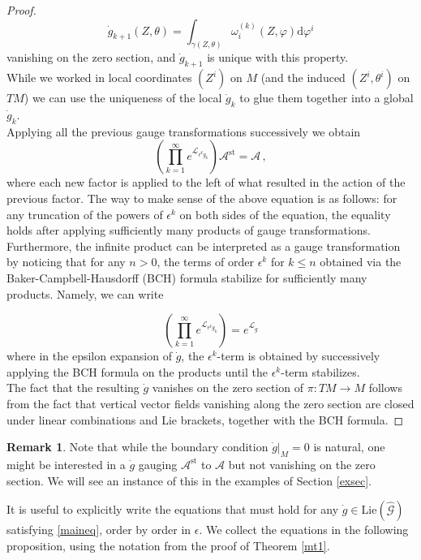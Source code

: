 \documentclass{article}
\theoremstyle{definition}
\newtheorem{remark}[theorem]{Remark}
\numberwithin{equation}{section}
\begin{document}
\begin{proof}
\begin{equation}\label{piformula}
    \dot{g}_{k+1}(Z,\theta)=\int_{\gamma(Z,\theta)}\omega_i^{(k)}(Z,\varphi)\mathrm{d}\varphi^i
\end{equation}
vanishing on the zero section, and $\dot{g}_{k+1}$ is unique with this property. \\

While we worked in local coordinates $(Z^i)$ on $M$ (and the induced $(Z^i,\theta^i)$ on $TM$) we can use the uniqueness of the local $\dot{g}_{k}$ to glue them together into a global $\dot{g}_k$.\\

Applying all the previous gauge transformations successively we obtain
\begin{equation*}
    \left(\prod_{k=1}^{\infty}e^{\mathcal{L}_{\epsilon^k\dot{g}_k}}\right)\mathcal{A}^{\text{st}}=\mathcal{A}\,,
\end{equation*}
where each new factor is applied to the left of what resulted in the action of the previous factor. The way to make sense of the above equation is as follows: for any truncation of the powers of $\epsilon^k$ on both sides of the equation, the equality holds after applying sufficiently many products of gauge transformations.  Furthermore, the infinite product can be interpreted as a gauge transformation by noticing that for any $n>0$, the terms of order $\epsilon^k$ for $k\leq n$ obtained via the Baker-Campbell-Hausdorff (BCH) formula stabilize for sufficiently many products. Namely, we can write 

\begin{equation*}
    \left(\prod_{k=1}^{\infty}e^{\mathcal{L}_{\epsilon^k\dot{g}_k}}\right)=e^{\mathcal{L}_{\dot{g}}}
\end{equation*}
where in the epsilon expansion of $\dot{g}$, the $\epsilon^k$-term is obtained by successively applying the BCH formula on the products until the $\epsilon^k$-term stabilizes.\\ 

The fact that the resulting $\dot{g}$ vanishes on the zero section of $\pi:TM\to M$ follows from the fact that vertical vector fields vanishing along the zero section are closed under linear combinations and Lie brackets, together with the BCH formula. 

\end{proof}

\begin{remark}
    Note that while the boundary condition $\dot{g}|_M=0$ is natural, one might be interested in a $\dot{g}$ gauging $\mathcal{A}^{\text{st}}$ to $\mathcal{A}$ but not vanishing on the zero section. We will see an instance of this in the examples of Section \ref{exsec}.
\end{remark}
It is useful to explicitly write the equations that must hold for any $\dot{g}\in \text{Lie}(\widehat{\mathcal{G}})$ satisfying \eqref{maineq}, order by order in $\epsilon$.  We collect the equations in the following proposition, using the notation from the proof of Theorem \ref{mt1}.
\end{document}
